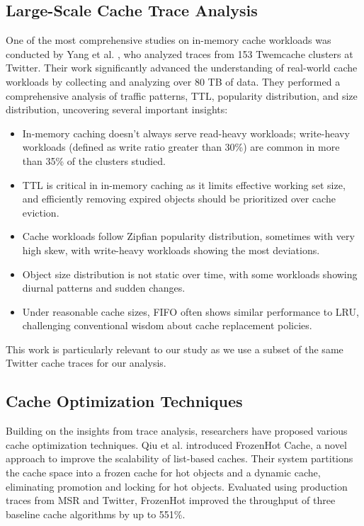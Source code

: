 \documentclass[conference]{IEEEtran}
\begin{document}
\subsection{Large-Scale Cache Trace Analysis}
One of the most comprehensive studies on in-memory cache workloads was conducted by Yang et al. \cite{yang2021large}, who analyzed traces from 153 Twemcache clusters at Twitter. Their work significantly advanced the understanding of real-world cache workloads by collecting and analyzing over 80 TB of data. They performed a comprehensive analysis of traffic patterns, TTL, popularity distribution, and size distribution, uncovering several important insights:

\begin{itemize}
    \item In-memory caching doesn't always serve read-heavy workloads; write-heavy workloads (defined as write ratio greater than 30\%) are common in more than 35\% of the clusters studied.
    \item TTL is critical in in-memory caching as it limits effective working set size, and efficiently removing expired objects should be prioritized over cache eviction.
    \item Cache workloads follow Zipfian popularity distribution, sometimes with very high skew, with write-heavy workloads showing the most deviations.
    \item Object size distribution is not static over time, with some workloads showing diurnal patterns and sudden changes.
    \item Under reasonable cache sizes, FIFO often shows similar performance to LRU, challenging conventional wisdom about cache replacement policies.
\end{itemize}

This work is particularly relevant to our study as we use a subset of the same Twitter cache traces for our analysis.

\subsection{Cache Optimization Techniques}
Building on the insights from trace analysis, researchers have proposed various cache optimization techniques. Qiu et al. \cite{qiu2023frozenhot} introduced FrozenHot Cache, a novel approach to improve the scalability of list-based caches. Their system partitions the cache space into a frozen cache for hot objects and a dynamic cache, eliminating promotion and locking for hot objects. Evaluated using production traces from MSR and Twitter, FrozenHot improved the throughput of three baseline cache algorithms by up to 551\%.
\end{document}
